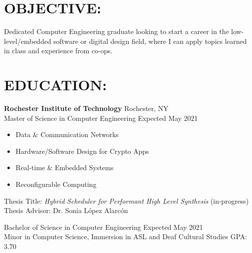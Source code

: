 \documentclass[line,margin]{res}
\begin{document}
\setlength\columnsep{-30pt}
\email{} %
\phone{} %
\address{} %
\address{} %
\website{} %

\begin{resume}
	 \setlength
	 \multicolsep{2pt}

	\section{OBJECTIVE:} %
		Dedicated Computer Engineering graduate looking to start a career in the low-level/embedded software or digital design field, where I can apply topics learned in class and experience from co-ops. 

	\section{EDUCATION:} 
		\textbf{Rochester Institute of Technology} \hfill Rochester, NY\\
		Master of Science in Computer Engineering \hfill Expected May 2021 
		\begin{multicols}{2}
			\setlength\columnsep{1pt}
			\begin{itemize}
				\setlength{\itemindent}{-10pt}
				\item[] Data \& Communication Networks
				\item[] Hardware/Software Design for Crypto Apps
				\item[] \hspace{10pt} Real-time \& Embedded Systems
				\item[] \hspace{10pt} Reconfigurable Computing
			\end{itemize}
		\end{multicols}
		\vspace{-11pt}
		Thesis Title: \textit{Hybrid Scheduler for Performant High Level Synthesis} (in-progress) \\
		Thesis Advisor: Dr. Sonia L\'opez Alarc\'on 
		\vspace{-4pt}

		Bachelor of Science in Computer Engineering \hfill Expected May 2021\\ 
		Minor in Computer Science, Immersion in ASL and Deaf Cultural Studies \hfill GPA: 3.70


\end{resume}
\end{document}
